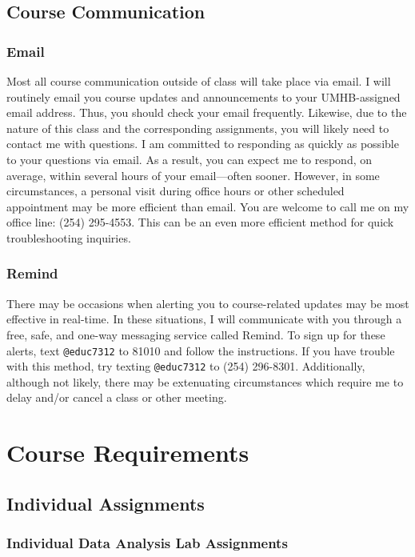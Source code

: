 \documentclass[
]{article}
\begin{document}
\subsection{Course Communication}

\subsubsection{Email}

Most all course communication outside of class will take place via
email. I will routinely email you course updates and announcements to
your UMHB-assigned email address. Thus, you should check your email
frequently. Likewise, due to the nature of this class and the
corresponding assignments, you will likely need to contact me with
questions. I am committed to responding as quickly as possible to your
questions via email. As a result, you can expect me to respond, on
average, within several hours of your email---often sooner. However, in
some circumstances, a personal visit during office hours or other
scheduled appointment may be more efficient than email. You are welcome
to call me on my office line: (254) 295-4553. This can be an even more
efficient method for quick troubleshooting inquiries.

\subsubsection{Remind}

There may be occasions when alerting you to course-related updates may
be most effective in real-time. In these situations, I will communicate
with you through a free, safe, and one-way messaging service called
Remind. To sign up for these alerts, text \texttt{@educ7312} to 81010
and follow the instructions. If you have trouble with this method, try
texting \texttt{@educ7312} to (254) 296-8301. Additionally, although not
likely, there may be extenuating circumstances which require me to delay
and/or cancel a class or other meeting.

\section{Course Requirements}

\subsection{Individual Assignments}

\subsubsection{Individual Data Analysis Lab Assignments}
\end{document}
